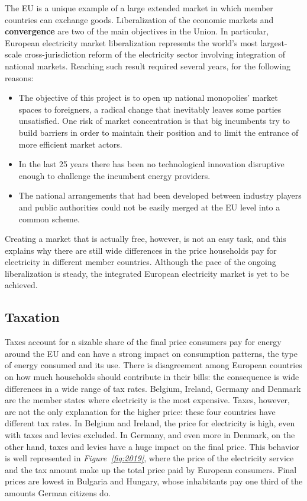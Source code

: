 \documentclass[a4paper,12pt]{book}
\begin{document}
The EU is a unique example of a large extended market in which member countries can exchange goods. Liberalization of the economic markets and \textbf{convergence} are two of the main objectives in the Union. In particular, European electricity market liberalization represents the world's most largest-scale cross-jurisdiction reform of the electricity sector involving integration of national markets. Reaching such result required several years, for the following reasons:

\begin{itemize}

\item The objective of this project is to open up national monopolies’ market spaces to foreigners, a radical change that inevitably leaves some parties unsatisfied.  One risk of market concentration is that big incumbents try to build barriers in order to maintain their position and to limit the entrance of more efficient market actors.~\cite{ringel2003liberalising}

\item In the last 25 years there has been no technological innovation disruptive enough to challenge the incumbent energy
providers.

\item The national arrangements that had been developed between industry players and public authorities could not be easily merged at the EU level into a common scheme.
\end{itemize}

Creating a market that is actually free, however, is not an easy task, and this explains why there are still wide differences in the price households pay for electricity in different member countries. Although the pace of the ongoing liberalization is steady, the integrated European electricity market is yet to be achieved. \\

\subsection{Taxation}

Taxes account for a sizable share of the final price consumers pay for energy around the EU and can have a strong impact on consumption patterns, the type of energy consumed and its use. There is disagreement among European countries on how much households should contribute in their bills: the consequence is wide differences in a wide range of tax rates. Belgium, Ireland, Germany and Denmark are the member states where electricity is the most expensive. Taxes, however, are not the only explanation for the higher price: these four countries have different tax rates. In Belgium and Ireland, the price for electricity is high, even with taxes and levies excluded. In Germany, and even more in Denmark, on the other hand, taxes and levies have a huge impact on the final price. This behavior is well represented in \textit{Figure~\ref{fig:2019}}, where the price of the electricity service and the tax amount make up the total price paid by European consumers. Final prices are lowest in Bulgaria and Hungary, whose inhabitants pay one third of the amounts German citizens do.
\end{document}
